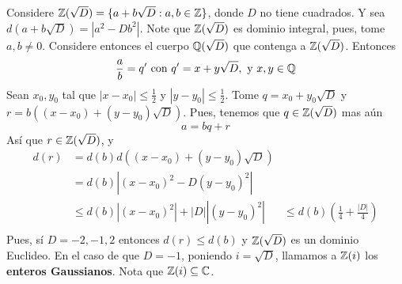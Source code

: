 \begin{example}\label{}
    Considere $\mathbb{Z}(\sqrt{D})=\{a+b\sqrt{D} : a,b \in \mathbb{Z}\}$, donde $D$ no tiene
    cuadrados. Y sea $d(a+b\sqrt{D})=|a^2-Db^2|$. Note que $\mathbb{Z}(\sqrt{D})$ es
    dominio integral, pues, tome $a,b \neq 0$. Considere entonces el cuerpo
    $\mathbb{Q}(\sqrt{D})$ que contenga a $\mathbb{Z}(\sqrt{D})$. Entonces
    \begin{equation*}
        \frac{a}{b}=q' \text{ con } q'=x+y\sqrt{D}, \text{ y } x,y \in \mathbb{Q}
    \end{equation*}
    Sean $x_0, y_0$ tal que $|x-x_0| \leq \frac{1}{2}$ y $|y-y_0| \leq
    \frac{1}{2}$. Tome $q=x_0+y_0\sqrt{D}$ y $r=b((x-x_0)+(y-y_0)\sqrt{D})$.
    Pues, tenemos que
    $q \in \mathbb{Z}(\sqrt{D})$ mas a\'un
    \begin{equation*}
        a=bq+r
    \end{equation*}
     As\'i que $r \in \mathbb{Z}(\sqrt{D})$, y
     \begin{align*}
         d(r)       &= d(b)d((x-x_0)+(y-y_0)\sqrt{D})  \\
                    &= d(b)|(x-x_0)^2-D(y-y_0)^2|   \\
                    & \leq d(b)|(x-x_0)^2|+|D||(y-y_0)^2|
                    & \leq d(b)(\frac{1}{4}+\frac{|D|}{4})  \\
     \end{align*}
     Pues, s\'i $D=-2,-1,2$ entonces $d(r) \leq d(b)$ y $\mathbb{Z}(\sqrt{D})$ es un
     dominio Euclideo. En el caso de que $D=-1$, poniendo  $i=\sqrt{D}$,
     llamamos a $\mathbb{Z}(i)$ los \textbf{enteros Gaussianos}. Nota que $\mathbb{Z}(i)
     \subseteq \mathbb{C}$.
\end{example}

